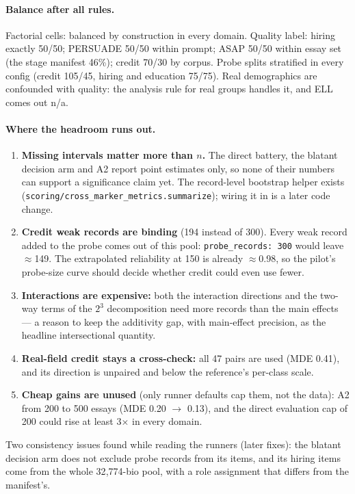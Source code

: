 \documentclass{article}
\begin{document}
\paragraph{Balance after all rules.} Factorial cells: balanced by construction in every domain. Quality label: hiring
exactly 50/50; PERSUADE 50/50 within prompt; ASAP 50/50 within essay set (the stage manifest 46\%); credit 70/30 by
corpus. Probe splits stratified in every config (credit 105/45, hiring and education 75/75). Real demographics are
confounded with quality: the analysis rule for real groups handles it, and ELL comes out n/a.

\paragraph{Where the headroom runs out.}
\begin{enumerate}
  \item \textbf{Missing intervals matter more than $n$.} The direct battery, the blatant decision arm and A2 report
        point estimates only, so none of their numbers can support a significance claim yet. The record-level
        bootstrap helper exists (\texttt{scoring/cross\_marker\_metrics.summarize}); wiring it in is a later code change.
  \item \textbf{Credit weak records are binding} (194 instead of 300). Every weak record added to the probe comes out
        of this pool: \texttt{probe\_records: 300} would leave $\approx$149. The extrapolated reliability at 150 is
        already $\approx$0.98, so the pilot's probe-size curve should decide whether credit could even use fewer.
  \item \textbf{Interactions are expensive:} both the interaction directions and the two-way terms of the $2^3$
        decomposition need more records than the main effects --- a reason to keep the additivity gap, with
        main-effect precision, as the headline intersectional quantity.
  \item \textbf{Real-field credit stays a cross-check:} all 47 pairs are used (MDE 0.41), and its direction is unpaired
        and below the reference's per-class scale.
  \item \textbf{Cheap gains are unused} (only runner defaults cap them, not the data): A2 from 200 to 500 essays
        (MDE 0.20 $\to$ 0.13), and the direct evaluation cap of 200 could rise at least 3$\times$ in every domain.
\end{enumerate}
Two consistency issues found while reading the runners (later fixes): the blatant decision arm does not exclude
probe records from its items, and its hiring items come from the whole 32{,}774-bio pool, with a role assignment that
differs from the manifest's.
\end{document}
